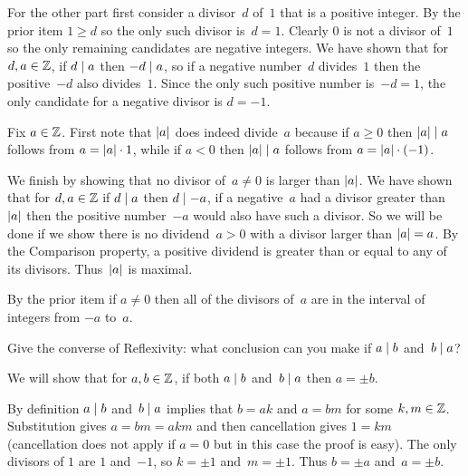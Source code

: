 \documentclass{ibl}  %
\begin{document}
\begin{ex}
\begin{ans}
\begin{exes}
  For the other part 
  first consider a divisor~$d$ of~$1$ that is a positive integer.
  By the prior item $1\geq d$ so the only such divisor is~$d=1$.
  Clearly $0$ is not a divisor of~$1$ so the only remaining candidates
  are negative integers.
  We have shown that for $d,a\in\mathbb{Z}$, if $d\mid a$ then $-d\mid a$,
  so if a negative number~$d$ divides~$1$ then the positive~$-d$ 
  also divides~$1$.
  Since the only such positive number is~$-d=1$, the only 
  candidate for a negative divisor is $d=-1$. 
\item Fix $a\in\mathbb{Z}$. 
  First note that $\lvert a\rvert$ does indeed divide~$a$ because
  if $a\geq 0$ then $\lvert a\rvert\mid a$ follows from 
  $a=\lvert a\rvert\cdot 1$,
  while if $a<0$ then $\lvert a\rvert\mid a$ follows from 
  $a=\lvert a\rvert\cdot(-1)$.

  We finish by showing that no divisor of~$a\neq 0$ is larger than $\lvert a\rvert$.
  We have shown that for $d,a\in\mathbb{Z}$ if $d\mid a$ then $d\mid -a$,
  if a negative~$a$ had a divisor greater than~$\lvert a\rvert$ then the
  positive number~$-a$ would also have such a divisor.
  So we will be done if
  we show there is no dividend~$a>0$ with a divisor larger than $\lvert a\rvert=a$.
  By the Comparison property, a positive dividend is greater than or 
  equal to any of its divisors. 
  Thus~$\lvert a\rvert$ is maximal.
\item By the prior item if $a\neq 0$ then all of the divisors of~$a$
  are in the interval of integers from $-a$ to~$a$. 
\end{exes}
\end{ans}
\end{ex}

\begin{ex}
Give the converse of Reflexivity: what conclusion can you make
if $a\mid b$ and~$b\mid a$?
\begin{ans}
We will show that for $a,b\in\mathbb{Z}$, if both $a\mid b$ and~$b\mid a$
then $a=\pm b$.

By definition $a\mid b$ and~$b\mid a$ implies that $b=ak$
and $a=bm$ for some $k,m\in\mathbb{Z}$.
Substitution gives $a=bm=akm$ and then cancellation gives $1=km$ (cancellation
does not apply if $a=0$ but in this case the proof is easy).
The only divisors of $1$ are $1$ and~$-1$, so $k=\pm 1$ and~$m=\pm 1$. 
Thus $b=\pm a$ and~$a=\pm b$.
\end{ans}
\end{ex}
\end{document}
